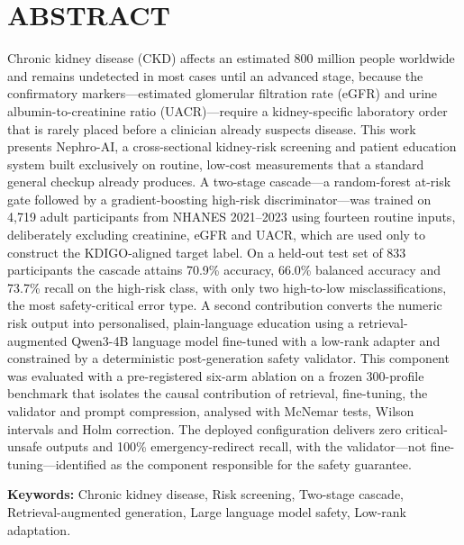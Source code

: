 \documentclass[12pt,a4paper,oneside]{report}
\newcommand{\eGFR}{eGFR}
\newcommand{\UACR}{UACR}
\begin{document}
\chapter*{ABSTRACT}
\thispagestyle{fancy}

Chronic kidney disease (CKD) affects an estimated 800 million people worldwide
and remains undetected in most cases until an advanced stage, because the
confirmatory markers---estimated glomerular filtration rate (\eGFR) and urine
albumin-to-creatinine ratio (\UACR)---require a kidney-specific laboratory
order that is rarely placed before a clinician already suspects disease. This
work presents Nephro-AI, a cross-sectional kidney-risk screening and patient
education system built exclusively on routine, low-cost measurements that a
standard general checkup already produces. A two-stage cascade---a
random-forest at-risk gate followed by a gradient-boosting high-risk
discriminator---was trained on 4{,}719 adult participants from NHANES
2021--2023 using fourteen routine inputs, deliberately excluding creatinine,
\eGFR{} and \UACR, which are used only to construct the KDIGO-aligned target
label. On a held-out test set of 833 participants the cascade attains 70.9\%
accuracy, 66.0\% balanced accuracy and 73.7\% recall on the high-risk class,
with only two high-to-low misclassifications, the most safety-critical error
type. A second contribution converts the numeric risk output into personalised,
plain-language education using a retrieval-augmented Qwen3-4B language model
fine-tuned with a low-rank adapter and constrained by a deterministic
post-generation safety validator. This component was evaluated with a
pre-registered six-arm ablation on a frozen 300-profile benchmark that isolates
the causal contribution of retrieval, fine-tuning, the validator and prompt
compression, analysed with McNemar tests, Wilson intervals and Holm correction.
The deployed configuration delivers zero critical-unsafe outputs and 100\%
emergency-redirect recall, with the validator---not fine-tuning---identified as
the component responsible for the safety guarantee.

\vspace{10pt}
\noindent\textbf{Keywords:} Chronic kidney disease, Risk screening, Two-stage
cascade, Retrieval-augmented generation, Large language model safety,
Low-rank adaptation.

\end{document}

